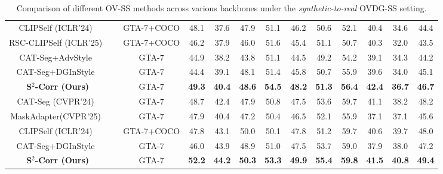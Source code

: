 \begin{table}[!t]
{\begin{tabular}{cccccccc|ccccc}
CLIPSelf (ICLR'24)~\cite{wu2023clipself} &       & GTA-7+COCO & 48.1  & 37.6  & 47.9  & 51.1  & 46.2  & 50.6  & 52.1  & 40.4  & 34.6  & 44.4  \\
RSC-CLIPSelf (ICLR'25)~\cite{qiu2025refining} &       & GTA-7+COCO & 46.2  & 37.9  & 46.0  & 51.6  & 45.4  & 51.1  & 50.7  & 40.3  & 32.0  & 43.5  \\
CAT-Seg+AdvStyle~\cite{zhong2022adversarial} &       & GTA-7 & 44.9  & 38.2  & 43.8  & 51.1  & 44.5  & 49.2  & 54.2  & 39.1  & 34.3  & 44.2  \\
CAT-Seg+DGInStyle~\cite{jia2024dginstyle} &       & GTA-7 & 44.4  & 39.1  & 48.1  & 51.4  & 45.8  & 50.7  & 55.9  & 39.6  & 34.0  & 45.1  \\
 \textbf{S$^2$-Corr (Ours)} &       & GTA-7 & \textbf{49.3} & \textbf{40.4} & \textbf{48.6} & \textbf{54.5} & \textbf{48.2} & \textbf{51.3} & \textbf{56.4} & \textbf{42.4} & \textbf{36.7} & \textbf{46.7} \\
\midrule
CAT-Seg (CVPR'24)~\cite{cho2024cat} &
      & GTA-7 & 48.7  & 42.4  & 47.9  & 50.8  & 47.5  & 53.6  & 59.7  & 41.1  & 38.2  & 48.2  \\
MaskAdapter(CVPR'25)~\cite{Li_2025_CVPR}  &       & GTA-7 & 47.9  & 40.4  & 47.2  & 50.4  & 46.5  & 52.1  & 55.9  & 37.1  & 37.1  & 45.6  \\
CLIPSelf (ICLR'24)~\cite{wu2023clipself} &       & GTA-7+COCO & 47.8  & 43.1  & 50.0  & 50.1  & 47.8  & 51.2  & 59.7  & 40.6  & 39.7  & 48.0  \\
CAT-Seg+DGInStyle~\cite{jia2024dginstyle} &       & GTA-7 & 46.0  & 43.9  & 48.9  & 51.0  & 47.5  & 53.7  & 59.0  & 37.9  & 38.0  & 47.2  \\
 \textbf{S$^2$-Corr (Ours)} &       & GTA-7 & \textbf{52.2} & \textbf{44.2} & \textbf{50.3} & \textbf{53.3} & \textbf{49.9} & \textbf{55.4} & \textbf{59.8} & \textbf{41.5} & \textbf{40.8} & \textbf{49.4} \\
\bottomrule
\end{tabular}%
}
 \setlength{\abovecaptionskip}{0.05 cm}
  \caption{Comparison of different OV-SS methods across various backbones under the \textit{synthetic-to-real} OVDG-SS setting.}
  \label{Tab3_ovdg_gta_vitL}%
  \vspace{-0.2cm}
\end{table}%
